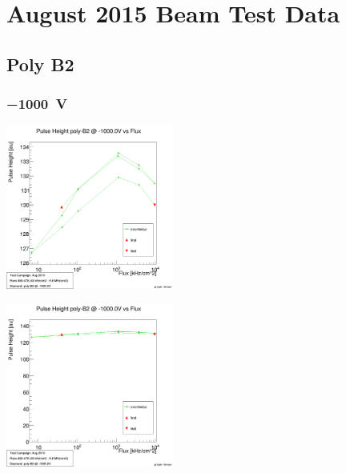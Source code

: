 \documentclass[9pt]{beamer}
\begin{document}
\section{August 2015 Beam Test Data}
\subsection{Poly B2}
\begin{frame}
	\frametitle{\SI{-1000}{V}}
	\begin{minipage}{5.5cm}
		\centering
		\includegraphics[width=5.5cm]{PhB2Neg}
	\end{minipage}
	\vspace*{2pt}
	\begin{minipage}{5.5cm}
		\centering
		\includegraphics[width=5.5cm]{PhB2NegZero}
	\end{minipage}
\end{frame}
\end{document}

